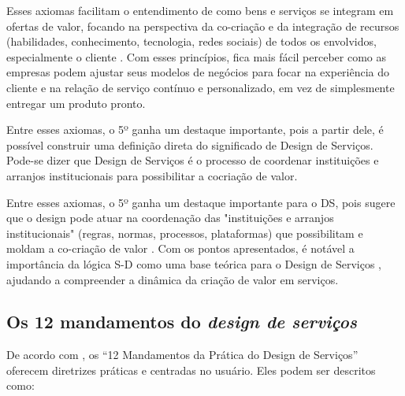 Esses axiomas facilitam o entendimento de como bens e serviços se integram em ofertas de valor, focando na perspectiva da co-criação e da integração de recursos (habilidades, conhecimento, tecnologia, redes sociais) de todos os envolvidos, especialmente o cliente \cite{yan2022pssvalue}. Com esses princípios, fica mais fácil perceber como as empresas podem ajustar seus modelos de negócios para focar na experiência do cliente e na relação de serviço contínuo e personalizado, em vez de simplesmente entregar um produto pronto.

Entre esses axiomas, o 5º ganha um destaque importante, pois a partir dele, é possível construir uma definição direta do significado de Design de Serviços. Pode-se dizer que Design de Serviços é o processo de coordenar instituições e arranjos institucionais para possibilitar a cocriação de valor.

Entre esses axiomas, o 5º ganha um destaque importante para o DS, pois sugere que o design pode atuar na coordenação das "instituições e arranjos institucionais" (regras, normas, processos, plataformas) que possibilitam e moldam a co-criação de valor \cite{VargoLusch2016Institutions}. Com os pontos apresentados, é notável a importância da lógica S-D como uma base teórica para o Design de Serviços \cite{Patricio2011Multilevel}, ajudando a compreender a dinâmica da criação de valor em serviços.

\subsection{Os 12 mandamentos do \textit{design de serviços}}

De acordo com , os ``12 Mandamentos da Prática do Design de Serviços'' oferecem diretrizes práticas e centradas no usuário. Eles podem ser descritos como:

